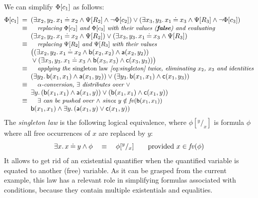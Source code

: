 \begin{example}
%
We can simplify $\Phi[{c_1}]$ as follows: 
%
\[\begin{array}{@{}l@{{\enspace}}c@{{\enspace}}l@{}}
 \tofol {c_1}
  & = & (\exists x_2,y_2\st x_1 \Eq x_2 \land \grtofol{R_2} \land\neg \tofol{c_2})
        \vee (\exists x_3,y_3\st x_1 \Eq x_3 \land \grtofol{R_3} \land \neg \tofol{c_3}) \\
  & \equiv & \text{\emph{\small replacing $\tofol{c_2}$ and $\tofol{c_3}$ with their values ($\False$) and evaluating}} \\
  && (\exists x_2,y_2 \st x_1 \Eq x_2 \land \grtofol{R_2})
     \vee (\exists x_3,y_3 \st x_1 \Eq x_3 \land  \grtofol {R_3}) \\
  & \equiv & \text{\emph{\small replacing $\grtofol {R_2}$ and $\grtofol {R_3}$ with their values}}\\
  && \bigl((\exists x_2,y_2\st  x_1 \Eq x_2 \land \lb(x_2,x_2)\land \la(x_2,y_2)) \\
  && {} \vee (\exists x_3,y_3\st x_1 \Eq x_3 \land \lb(x_3,x_3)\land \lc(x_3,y_3)) \bigr)\\
  & \equiv & \text{\emph{\small applying the \emph{singleton law}~\eqref{eq:singleton} twice, eliminating $x_2$, $x_3$ and identities}} \\
  && (\exists y_2 \st \lb(x_1,x_1)\land \la(x_1,y_2)) \lor (\exists y_3 \st  \lb(x_1,x_1)\land \lc(x_1,y_3))\\
  & \equiv & \text{\emph{\small $\alpha$-conversion, $\exists$ distributes over $\vee$}}\\
  && \exists y \st (\lb(x_1,x_1)\land \la(x_1,y)) \lor ( \lb(x_1,x_1)\land \lc(x_1,y)) \\
  & \equiv & \text{\emph{\small $\exists$ can be pushed over $\wedge$ since $y\notin\fv(\lb(x_1,x_1))$}} \\
  && \lb(x_1,x_1)\land \exists y \st (\la(x_1,y) \lor \lc(x_1,y))\\
\end{array}\]
%
The \emph{singleton law} is the following logical equivalence, where $\phi[^y/_x]$ is formula $\phi$ where all free occurrences of $x$ are replaced by $y$:
\begin{equation}
\exists x.\, x \mathbin{\doteq} y \wedge \phi \quad \equiv \quad \phi[^y/_x] \qquad \text{provided } x\in \mathit{fv}(\phi) \label{eq:singleton}
\end{equation} 
It allows to get rid of an existential quantifier when the quantified variable is equated to another (free) variable. As it can be grasped from the current example, this law  has a relevant role in simplifying formulas associated with conditions, because they contain multiple existentials and equalities.


\end{example}
